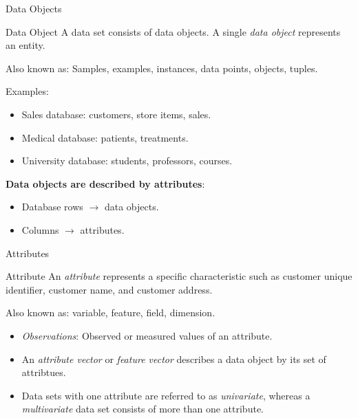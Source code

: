 \begin{frame}{Data Objects}
	\begin{block}{Data Object}
		A data set consists of data objects. A single \textit{data object} represents an entity.
	\end{block}

	Also known as: Samples, examples, instances, data points, objects, tuples.\\\medskip

	Examples:
	\begin{itemize}
		\item Sales database: customers, store items, sales.
		\item Medical database: patients, treatments.
		\item University database: students, professors, courses.
	\end{itemize}

	\textbf{Data objects are described by attributes}:
	\begin{itemize}
		\item Database rows $\rightarrow$ data objects.
		\item Columns $\rightarrow$ attributes.
	\end{itemize}
\end{frame}

\begin{frame}{Attributes}
	\begin{block}{Attribute}
		An \textit{attribute} represents a specific characteristic such as customer
		unique identifier, customer name, and customer address.
	\end{block}

	Also known as: variable, feature, field, dimension.\\\medskip


	\begin{itemize}
		\item \textit{Observations}: Observed or measured values of an attribute.
		\item An \textit{attribute vector} or \textit{feature vector} describes a
		      data object by its set of attribtues.
		\item Data sets with one attribute are referred to as \textit{univariate},
		      whereas a \textit{multivariate} data set consists of more than one
		      attribute.
	\end{itemize}
\end{frame}

